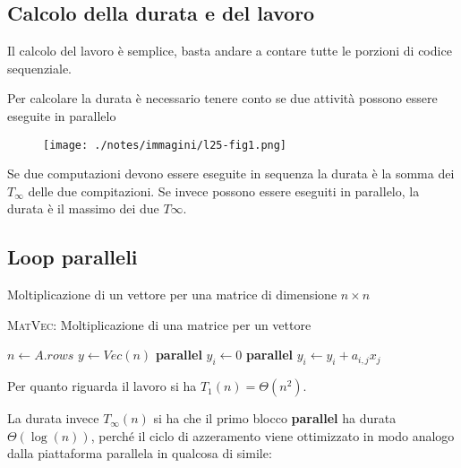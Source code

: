 
\subsection{Calcolo della durata e del lavoro}\label{calcolo-della-durata-e-del-lavoro}

Il calcolo del lavoro è semplice, basta andare a contare tutte le porzioni di codice sequenziale.

Per calcolare la durata è necessario tenere conto se due attività possono essere eseguite in parallelo

\begin{figure}[htbp]
\centering
\texttt{[image: ./notes/immagini/l25-fig1.png]}
\caption{}
\end{figure}

Se due computazioni devono essere eseguite in sequenza la durata è la somma dei $T_\infty$ delle due compitazioni. Se invece possono essere eseguiti in parallelo, la durata è il massimo dei due $T\infty$.

\subsection{Loop paralleli}\label{loop-paralleli}

Moltiplicazione di un vettore per una matrice di dimensione $n \times n$

\begin{breakablealgorithm}
	\caption{\textsc{MatVec}: Moltiplicazione di una matrice per un vettore}
	\begin{algorithmic}[1]
    \State $n \gets A.rows$
    \State $y\gets Vec(n)$
    \State \textbf{parallel}
        \State $y_i \gets 0$
    \EndFor
    \State \textbf{parallel}
            \State $y_i \gets y_i + a_{i,j}x_j$
        \EndFor
    \EndFor
\EndFunction
\end{algorithmic}
\end{breakablealgorithm}


Per quanto riguarda il lavoro si ha $T_1(n) = \Theta(n^2)$.

La durata invece $T_\infty(n)$ si ha che il primo blocco \textbf{parallel} ha durata $\Theta(\log(n))$, perché il ciclo di azzeramento viene ottimizzato in modo analogo dalla piattaforma parallela in qualcosa di simile:

